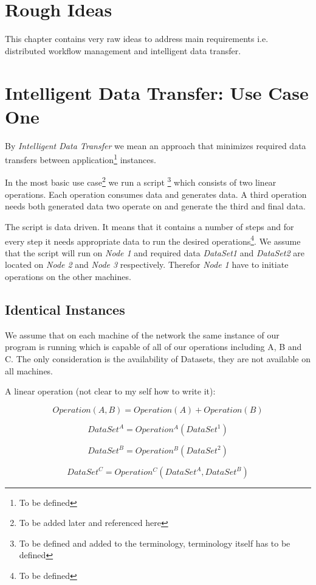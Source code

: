 \section{Rough Ideas}

This chapter contains very raw ideas to address main requirements i.e.
distributed workflow management and intelligent data transfer.

\section{Intelligent Data Transfer: Use Case One}
By \textit{Intelligent Data Transfer} we mean an approach that
minimizes required data transfers between application\footnote{To be defined}
instances.

In the most basic use case\footnote{To be added later and 
referenced here} we run a script
\footnote{To be defined and added to
the terminology, terminology itself has to be defined}
which consists of two linear operations. Each operation consumes data
and generates data. A third operation needs both generated data two 
operate on and generate the third and final data.

The script is data driven. It means that it contains a number
of steps and for every step it needs appropriate data to run the
desired operations\footnote{To be defined}. We assume that
the script will run on \textit{Node 1} and required data 
\textit{DataSet1} and \textit{DataSet2} are 
located on \textit{Node 2}
and \textit{Node 3} respectively. Therefor \textit{Node 1} have
to initiate operations on the other machines.

\subsection{Identical Instances}
We assume that on each machine of the network the same instance of our program is running which 
is capable of all of our operations
including A, B and C. The only consideration is the availability of 
Datasets, they are not available on all machines.

A linear operation (not clear to my self how to write it):

\[ Operation(A, B) = Operation(A) + Operation(B) \]

\[ DataSet^A = Operation^A(DataSet^1) \]

\[ DataSet^B = Operation^B(DataSet^2) \]

\[ DataSet^C = Operation^C(DataSet^A, DataSet^B) \]

